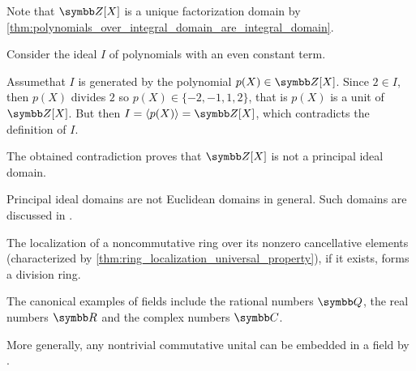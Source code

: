 \begin{example}
\begin{description}
    Note that \( \Z[X] \) is a unique factorization domain by \cref{thm:polynomials_over_integral_domain_are_integral_domain}.

    Consider the ideal \( I \) of polynomials with an even constant term.

    Assume\LEM that \( I \) is generated by the polynomial \( p(X) \in \Z[X] \). Since \( 2 \in I \), then \( p(X) \) divides \( 2 \) so \( p(X) \in \{ -2, -1, 1, 2 \} \), that is \( p(X) \) is a unit of \( \Z[X] \). But then \( I = \Gen{p(X)} = \Z[X] \), which contradicts the definition of \( I \).

    The obtained contradiction proves that \( \Z[X] \) is not a principal ideal domain.

     Principal ideal domains are not Euclidean domains in general. Such domains are discussed in \cite{Anderson1986}.

     The localization of a noncommutative ring over its nonzero cancellative elements (characterized by \cref{thm:ring_localization_universal_property}), if it exists, forms a division ring.

     The canonical examples of fields include the rational numbers \( \Q \), the real numbers \( \R \) and the complex numbers \( \Co \).

    More generally, any nontrivial commutative unital can be embedded in a field by .
  \end{description}
\end{example}

